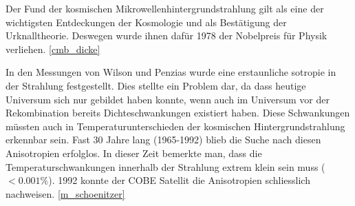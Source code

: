 Der Fund der kosmischen Mikrowellenhintergrundstrahlung gilt als eine der wichtigsten Entdeckungen der Kosmologie und als 
Bestätigung der Urknalltheorie.
Deswegen wurde ihnen dafür 1978 der Nobelpreis für Physik verliehen.
\ref{cmb_dicke}

In den Messungen von Wilson und Penzias wurde eine erstaunliche sotropie in der 
Strahlung festgestellt.
Dies stellte ein Problem dar, da dass heutige Universum sich nur gebildet haben 
konnte, wenn auch im Universum vor der Rekombination bereits Dichteschwankungen 
existiert haben.
Diese Schwankungen müssten auch in Temperaturunterschieden der kosmischen 
Hintergrundstrahlung erkennbar sein.
Fast 30 Jahre lang (1965-1992) blieb die Suche nach diesen Anisotropien 
erfolglos.
In dieser Zeit bemerkte man, dass die Temperaturschwankungen innerhalb der 
Strahlung extrem klein sein muss ($< 0.001\%$).
1992 konnte der \ac{COBE} Satellit die Anisotropien schliesslich nachweisen.
\ref{m_schoenitzer}

